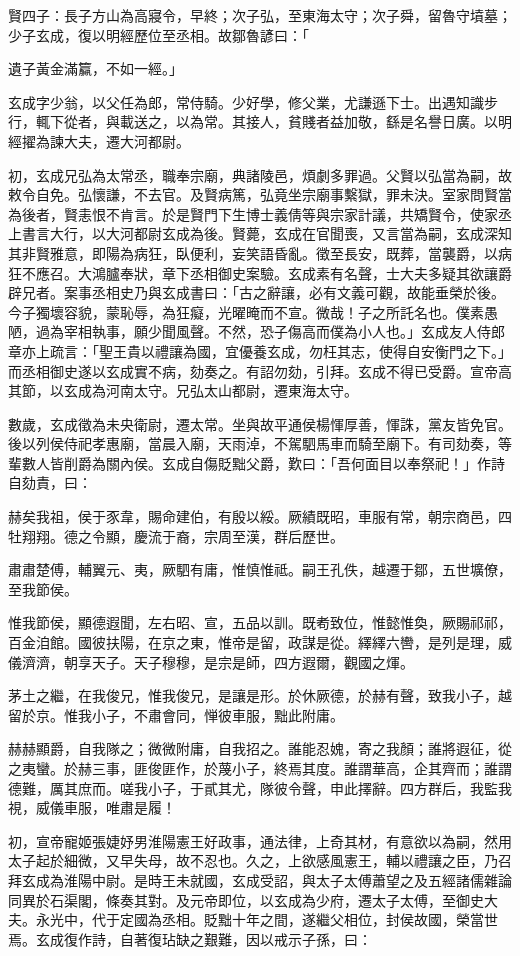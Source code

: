 \begin{pinyinscope}
賢四子：長子方山為高寢令，早終；次子弘，至東海太守；次子舜，留魯守墳墓；少子玄成，復以明經歷位至丞相。故鄒魯諺曰：「

遺子黃金滿籯，不如一經。」

玄成字少翁，以父任為郎，常侍騎。少好學，修父業，尤謙遜下士。出遇知識步行，輒下從者，與載送之，以為常。其接人，貧賤者益加敬，繇是名譽日廣。以明經擢為諫大夫，遷大河都尉。

初，玄成兄弘為太常丞，職奉宗廟，典諸陵邑，煩劇多罪過。父賢以弘當為嗣，故敕令自免。弘懷謙，不去官。及賢病篤，弘竟坐宗廟事繫獄，罪未決。室家問賢當為後者，賢恚恨不肯言。於是賢門下生博士義倩等與宗家計議，共矯賢令，使家丞上書言大行，以大河都尉玄成為後。賢薨，玄成在官聞喪，又言當為嗣，玄成深知其非賢雅意，即陽為病狂，臥便利，妄笑語昏亂。徵至長安，既葬，當襲爵，以病狂不應召。大鴻臚奉狀，章下丞相御史案驗。玄成素有名聲，士大夫多疑其欲讓爵辟兄者。案事丞相史乃與玄成書曰：「古之辭讓，必有文義可觀，故能垂榮於後。今子獨壞容貌，蒙恥辱，為狂癡，光曜晻而不宣。微哉！子之所託名也。僕素愚陋，過為宰相執事，願少聞風聲。不然，恐子傷高而僕為小人也。」玄成友人侍郎章亦上疏言：「聖王貴以禮讓為國，宜優養玄成，勿枉其志，使得自安衡門之下。」而丞相御史遂以玄成實不病，劾奏之。有詔勿劾，引拜。玄成不得已受爵。宣帝高其節，以玄成為河南太守。兄弘太山都尉，遷東海太守。

數歲，玄成徵為未央衛尉，遷太常。坐與故平通侯楊惲厚善，惲誅，黨友皆免官。後以列侯侍祀孝惠廟，當晨入廟，天雨淖，不駕駟馬車而騎至廟下。有司劾奏，等輩數人皆削爵為關內侯。玄成自傷貶黜父爵，歎曰：「吾何面目以奉祭祀！」作詩自劾責，曰：

赫矣我祖，侯于豕韋，賜命建伯，有殷以綏。厥績既昭，車服有常，朝宗商邑，四牡翔翔。德之令顯，慶流于裔，宗周至漢，群后歷世。

肅肅楚傅，輔翼元、夷，厥駟有庸，惟慎惟祗。嗣王孔佚，越遷于鄒，五世壙僚，至我節侯。

惟我節侯，顯德遐聞，左右昭、宣，五品以訓。既耇致位，惟懿惟奐，厥賜祁祁，百金洎館。國彼扶陽，在京之東，惟帝是留，政謀是從。繹繹六轡，是列是理，威儀濟濟，朝享天子。天子穆穆，是宗是師，四方遐爾，觀國之煇。

茅土之繼，在我俊兄，惟我俊兄，是讓是形。於休厥德，於赫有聲，致我小子，越留於京。惟我小子，不肅會同，惮彼車服，黜此附庸。

赫赫顯爵，自我隊之；微微附庸，自我招之。誰能忍媿，寄之我顏；誰將遐征，從之夷蠻。於赫三事，匪俊匪作，於蔑小子，終焉其度。誰謂華高，企其齊而；誰謂德難，厲其庶而。嗟我小子，于貳其尤，隊彼令聲，申此擇辭。四方群后，我監我視，威儀車服，唯肅是履！

初，宣帝寵姬張婕妤男淮陽憲王好政事，通法律，上奇其材，有意欲以為嗣，然用太子起於細微，又早失母，故不忍也。久之，上欲感風憲王，輔以禮讓之臣，乃召拜玄成為淮陽中尉。是時王未就國，玄成受詔，與太子太傅蕭望之及五經諸儒雜論同異於石渠閣，條奏其對。及元帝即位，以玄成為少府，遷太子太傅，至御史大夫。永光中，代于定國為丞相。貶黜十年之間，遂繼父相位，封侯故國，榮當世焉。玄成復作詩，自著復玷缺之艱難，因以戒示子孫，曰：


\end{pinyinscope}
